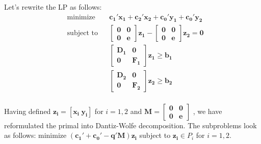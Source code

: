 \documentclass{article}
\begin{document}
\noindent
Let's rewrite the LP as follows: 
\begin{equation*}
\begin{aligned}
& \text{minimize} && \mathbf{c_1' x_1 + c_2' x_2 + c_0' y_1 + c_0' y_2} \\
& \text{subject to} && \mathbf{\begin{bmatrix} \mathbf{0} & \mathbf{0} \\ 
\mathbf{0} & \mathbf{e}
\end{bmatrix} z_1 - \begin{bmatrix} \mathbf{0} & \mathbf{0} \\ 
\mathbf{0} & \mathbf{e}
\end{bmatrix} z_2 = 0} \\
&&&  \begin{bmatrix} \mathbf{D_1} & \mathbf{0} \\ 
\mathbf{0} & \mathbf{F_1}
\end{bmatrix} \mathbf{z_1 \geq b_1} \\
&&&  \begin{bmatrix} \mathbf{D_2} & \mathbf{0} \\ 
\mathbf{0} & \mathbf{F_2}
\end{bmatrix} \mathbf{z_2 \geq b_2} \\
\end{aligned}
\end{equation*}

\noindent
Having defined $\mathbf{z_i = [x_i \; y_i]}$ for $i = 1,2$ and $\mathbf{M = } \begin{bmatrix} \mathbf{0} & \mathbf{0} \\ 
\mathbf{0} & \mathbf{e}
\end{bmatrix}$ , we have reformulated the primal into Dantiz-Wolfe decomposition.  The subproblems look as follows:  minimize $\mathbf{(c_1' + c_0' - q'M) z_i}$ subject to $\mathbf{z_i} \in P_i$ for $i = 1,2$.    
\end{document}
